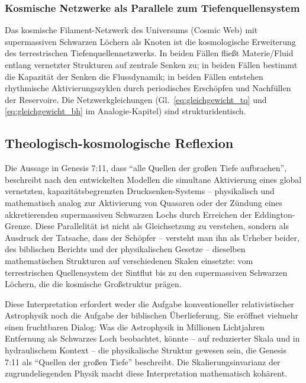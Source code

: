 ﻿\documentclass[12pt,a4paper]{report}
\begin{document}
\subsubsection{Kosmische Netzwerke als Parallele zum Tiefenquellensystem}

Das kosmische Filament-Netzwerk des Universums (Cosmic Web) mit supermassiven Schwarzen Löchern als Knoten \cite{bond1996,kormendy2013} ist die kosmologische Erweiterung des terrestrischen Tiefenquellennetzwerks. In beiden Fällen fließt Materie/Fluid entlang vernetzter Strukturen auf zentrale Senken zu; in beiden Fällen bestimmt die Kapazität der Senken die Flussdynamik; in beiden Fällen entstehen rhythmische Aktivierungszyklen durch periodisches Erschöpfen und Nachfüllen der Reservoire. Die Netzwerkgleichungen (Gl.~\ref{eq:gleichgewicht_tq} und \ref{eq:gleichgewicht_bh} im Analogie-Kapitel) sind strukturidentisch.

\subsection{Theologisch-kosmologische Reflexion}

Die Aussage in Genesis 7:11, dass "`alle Quellen der großen Tiefe aufbrachen"', beschreibt nach den entwickelten Modellen die simultane Aktivierung eines global vernetzten, kapazitätsbegrenzten Drucksenken-Systems -- physikalisch und mathematisch analog zur Aktivierung von Quasaren oder der Zündung eines akkretierenden supermassiven Schwarzen Lochs durch Erreichen der Eddington-Grenze. Diese Parallelität ist nicht als Gleichsetzung zu verstehen, sondern als Ausdruck der Tatsache, dass der Schöpfer -- versteht man ihn als Urheber beider, des biblischen Berichts und der physikalischen Gesetze -- dieselben mathematischen Strukturen auf verschiedenen Skalen einsetzte: vom terrestrischen Quellensystem der Sintflut bis zu den supermassiven Schwarzen Löchern, die die kosmische Großstruktur prägen.

Diese Interpretation erfordert weder die Aufgabe konventioneller relativistischer Astrophysik noch die Aufgabe der biblischen Überlieferung. Sie eröffnet vielmehr einen fruchtbaren Dialog: Was die Astrophysik in Millionen Lichtjahren Entfernung als Schwarzes Loch beobachtet, könnte -- auf reduzierter Skala und in hydraulischem Kontext -- die physikalische Struktur gewesen sein, die Genesis 7:11 als "`Quellen der großen Tiefe"' beschreibt. Die Skalierungsinvarianz der zugrundeliegenden Physik macht diese Interpretation mathematisch kohärent.
\end{document}
